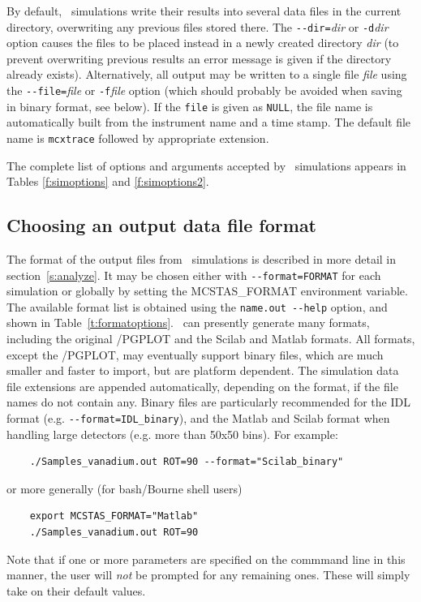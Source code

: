 By default, \MCX\ simulations write their results into several data files in the
current directory, overwriting any previous files stored there. The
\verb+--dir=+\textit{dir} or \verb+-d+\textit{dir} option causes the files to be
placed instead in a newly created directory \textit{dir} (to prevent overwriting
previous results an error message is given if the directory already exists).
Alternatively, all output may be written to a single file \textit{file} using
the \verb+--file=+\textit{file} or \verb+-f+\textit{file} option (which should
probably be avoided when saving in binary format, see below). If the
\verb+file+ is given as \verb+NULL+, the file name is automatically built from
the instrument name and a time stamp. The default file name is \verb+mcxtrace+
followed by appropriate extension.

The complete list of options
and arguments accepted by \MCX\ simulations appears in
Tables \ref{f:simoptions} and \ref{f:simoptions2}.

\subsection{Choosing an output data file format}

%
The format of the output files from \MCX\ simulations is described in
more detail in section~\ref{s:analyze}. It may be chosen either with \verb+--format=FORMAT+ for each simulation or globally by setting the MCSTAS\_FORMAT environment variable. 
The available format list is obtained using the \verb+name.out --help+ option, and shown in Table~\ref{t:formatoptions}.      
\MCX\ can presently generate many formats, including the original \MCX /PGPLOT and the Scilab and Matlab formats. All formats, except the \MCX /PGPLOT, may eventually support binary files, which are much smaller and faster to import, but are platform dependent. The simulation data file extensions are appended automatically, depending on the format, if the file names do not contain any. Binary files are particularly recommended for the IDL format (e.g. \verb+--format=IDL_binary+), and the Matlab and Scilab format when handling large detectors (e.g. more than 50x50 bins). For example:
\begin{verbatim}
    ./Samples_vanadium.out ROT=90 --format="Scilab_binary"
\end{verbatim}
or more generally (for bash/Bourne shell users)
\begin{verbatim}
    export MCSTAS_FORMAT="Matlab"
    ./Samples_vanadium.out ROT=90
\end{verbatim}
Note that if one or more parameters are specified on the commmand line in this
manner, the user will \emph{not} be prompted for any remaining ones. These will
simply take on their default values.

